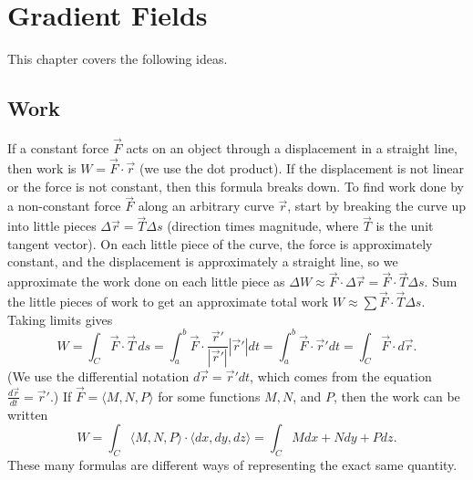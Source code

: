 
\chapter{Gradient Fields}

This chapter covers the following ideas. 


\section{Work}

If a constant force $\vec F$ acts on an object through a displacement
in a straight line, then work is {$ W= \vec F\cdot \vec r $} (we use the
dot product).  If the displacement is not linear or the force is not
constant, then this formula breaks down. To find work done by a
non-constant force $\vec F$ along an arbitrary curve $\vec r$, start
by breaking the curve up into little pieces $\Delta \vec r = \vec T \Delta s$
(direction times magnitude, where $\vec T$ is the unit tangent
vector). On each little piece of the curve, the force is approximately
constant, and the displacement is approximately a straight line, so we
approximate the work done on each little piece as {$ \Delta W \approx \vec F \cdot \Delta
\vec r = \vec F \cdot \vec T \Delta s $}.  Sum the little pieces of work to get an
approximate total work {$ W \approx \sum \vec F \cdot \vec T \Delta s $}.  Taking limits
gives 
$$%
W = \int_C \vec F\cdot \vec T \,ds 
= \int_a^b\vec F\cdot \frac{\vec r'}{|\vec r'|}|\vec r'| dt 
= \int_a^b\vec F\cdot \vec r' dt 
= \int_C \vec F\cdot d\vec r.$$
(We use the differential notation {$ d\vec r= \vec r' dt $}, which
comes from the equation {$ \frac{d\vec r}{dt} = \vec r' $}.)
If {$ \vec F = \langle M,N,P\rangle $} for some functions $M,N$, and
$P$, then the work can be written 
$$W = \int_C \langle M,N,P\rangle\cdot\langle dx,dy,dz\rangle 
= \int_C Mdx+Ndy+Pdz.$$ These many formulas are different ways of
representing the exact same quantity.

